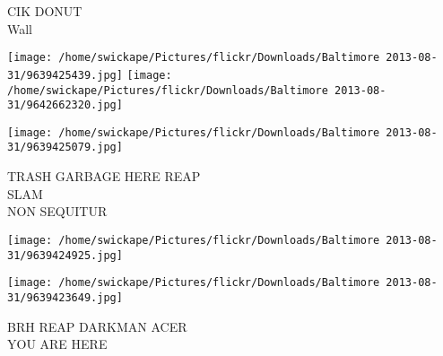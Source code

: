\documentclass[10pt,letterpaper]{article}
\begin{document}
CIK DONUT\\
Wall\\
\pagebreak

\texttt{[image: /home/swickape/Pictures/flickr/Downloads/Baltimore 2013-08-31/9639425439.jpg]}
\texttt{[image: /home/swickape/Pictures/flickr/Downloads/Baltimore 2013-08-31/9642662320.jpg]}

\texttt{[image: /home/swickape/Pictures/flickr/Downloads/Baltimore 2013-08-31/9639425079.jpg]}

TRASH GARBAGE HERE REAP\\
SLAM\\
NON SEQUITUR\\
\pagebreak

\texttt{[image: /home/swickape/Pictures/flickr/Downloads/Baltimore 2013-08-31/9639424925.jpg]}

\vspace{0.25in}
\texttt{[image: /home/swickape/Pictures/flickr/Downloads/Baltimore 2013-08-31/9639423649.jpg]}

BRH REAP DARKMAN ACER\\
YOU ARE HERE\\
\pagebreak
\end{document}

